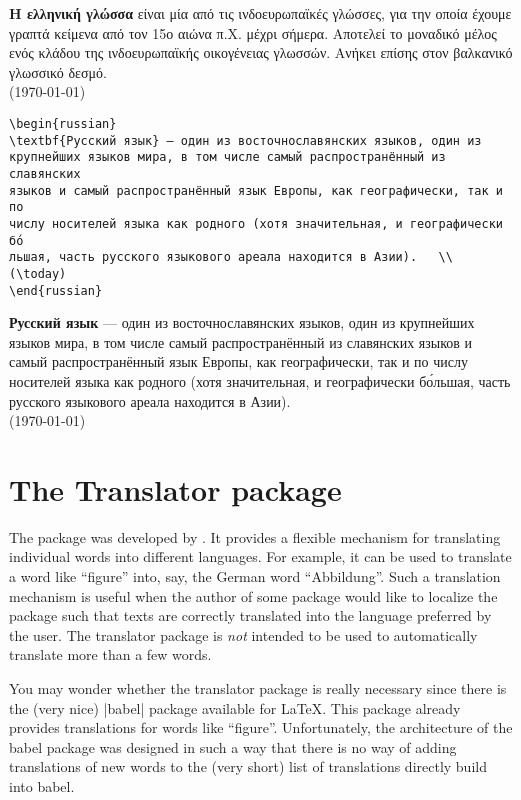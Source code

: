 \topline

\textbf{Η ελληνική γλώσσα} είναι μία από τις ινδοευρωπαϊκές γλώσσες, για την
οποία έχουμε γραπτά κείμενα από τον 15ο αιώνα π.Χ. μέχρι σήμερα. Αποτελεί το
μοναδικό μέλος ενός κλάδου της ινδοευρωπαϊκής οικογένειας γλωσσών. Ανήκει
επίσης στον βαλκανικό γλωσσικό δεσμό.\\	
(\today) 

\bottomline

\begin{verbatim}
\begin{russian}
\textbf{Русский язык} — один из восточнославянских языков, один из 
крупнейших языков мира, в том числе самый распространённый из славянских
языков и самый распространённый язык Европы, как географически, так и по
числу носителей языка как родного (хотя значительная, и географически бо́
льшая, часть русского языкового ареала находится в Азии).	\\
(\today)
\end{russian}
\end{verbatim}



\textbf{Русский язык} — один из восточнославянских языков, один из крупнейших языков мира, в том числе самый распространённый из славянских языков и самый распространённый язык Европы, как географически, так и по числу носителей языка как родного (хотя значительная, и географически бо́льшая, часть русского языкового ареала находится в Азии).	\\
(\today)


\section{The Translator package}

The  package was developed by  \citep{translator}. It provides a flexible
mechanism for translating individual words into different languages.
For example, it can be used to translate a word like ``figure'' into,
say, the German word ``Abbildung''. Such a translation mechanism is
useful when the author of some package would like to localize the
package such that texts are correctly translated into the language
preferred by the user. The translator package is \emph{not} intended
to be used to automatically translate more than a few words. 

You may wonder whether the translator package is really necessary
since there is the (very nice) |babel| package available for
\LaTeX. This package already provides translations for words like
``figure''. Unfortunately, the architecture of the babel package was
designed in such a way that there is no way of adding translations of
new words to the (very short) list of translations directly build into
babel.

